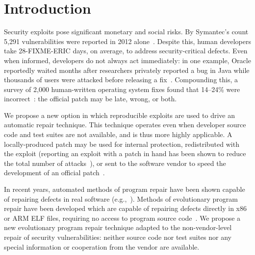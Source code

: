 \documentclass{sigcomm-alternate}
\begin{document}
\section{Introduction}
\label{sec-1}
Security exploits pose significant monetary and social risks. By Symantec's
count 5,291 vulnerabilities were reported in 2012
alone~\cite{symantec2013threat}. Despite this, human developers take
28-FIXME-ERIC days, on average, to address security-critical defects. Even
when informed, developers do not always act immediately:  in one example,
Oracle reportedly waited months after researchers privately reported a bug
in Java while thousands of users were attacked before releasing a
fix~\cite{greenberg2012oracle}.  Compounding this, a survey of 2,000
human-written operating system fixes found that 14--24\% were
incorrect~\cite{fixes-become-bugs}: the official patch may be late, wrong,
or both.  

We propose a new option in which reproducible exploits are used to drive an
automatic repair technique. This technique operates even when developer
source code and test suites are not available, and is thus more highly
applicable. A locally-produced patch may be used for internal protection,
redistributed with the exploit (reporting an exploit with a patch in hand
has been shown to reduce the total number of attacks~\cite{arora2006does}),
or sent to the software vendor to speed the development of an official
patch~\cite{weimer06}.

In recent years, automated methods of program repair have been shown
capable of repairing defects in real software
(e.g.,~\cite{clearview,genprog-tse-journal,par,nguyen2013semfix}).
Methods of evolutionary program repair have been developed which are
capable of repairing defects directly in x86 or ARM ELF files,
requiring no access to program source code~\cite{schulte2013embedded}.  
We propose a new evolutionary program repair technique adapted to
the non-vendor-level repair of security vulnerabilities: neither source
code nor test suites nor any special information or cooperation from the
vendor are available. 
\end{document}

